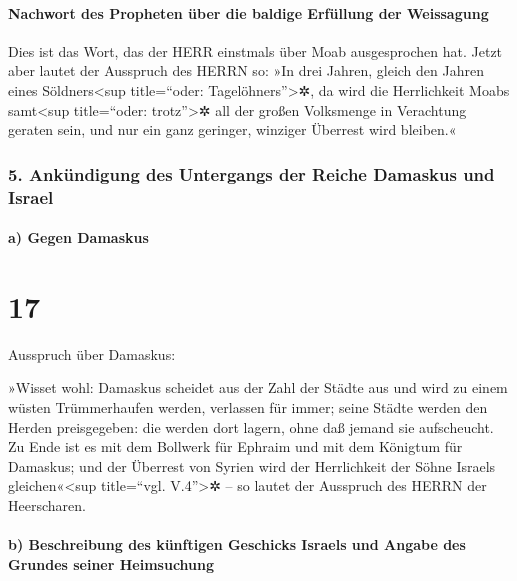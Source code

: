 \hypertarget{nachwort-des-propheten-uxfcber-die-baldige-erfuxfcllung-der-weissagung}{%
\paragraph{Nachwort des Propheten über die baldige Erfüllung der
Weissagung}\label{nachwort-des-propheten-uxfcber-die-baldige-erfuxfcllung-der-weissagung}}

Dies ist das Wort, das der HERR einstmals über Moab
ausgesprochen hat. Jetzt aber lautet der Ausspruch des
HERRN so: »In drei Jahren, gleich den Jahren eines Söldners\textless sup
title=``oder: Tagelöhners''\textgreater✲, da wird die Herrlichkeit Moabs
samt\textless sup title=``oder: trotz''\textgreater✲ all der großen
Volksmenge in Verachtung geraten sein, und nur ein ganz geringer,
winziger Überrest wird bleiben.«

\hypertarget{ankuxfcndigung-des-untergangs-der-reiche-damaskus-und-israel}{%
\subsubsection{5. Ankündigung des Untergangs der Reiche Damaskus und
Israel}\label{ankuxfcndigung-des-untergangs-der-reiche-damaskus-und-israel}}

\hypertarget{a-gegen-damaskus}{%
\paragraph{a) Gegen Damaskus}\label{a-gegen-damaskus}}

\hypertarget{section-16}{%
\section{17}\label{section-16}}

Ausspruch über Damaskus:

»Wisset wohl: Damaskus scheidet aus der Zahl der Städte aus und wird zu
einem wüsten Trümmerhaufen werden, verlassen für immer;
seine Städte werden den Herden preisgegeben: die werden dort lagern,
ohne daß jemand sie aufscheucht. Zu Ende ist es mit dem
Bollwerk für Ephraim und mit dem Königtum für Damaskus; und der Überrest
von Syrien wird der Herrlichkeit der Söhne Israels
gleichen«\textless sup title=``vgl. V.4''\textgreater✲ -- so lautet der
Ausspruch des HERRN der Heerscharen.

\hypertarget{b-beschreibung-des-kuxfcnftigen-geschicks-israels-und-angabe-des-grundes-seiner-heimsuchung}{%
\paragraph{b) Beschreibung des künftigen Geschicks Israels und Angabe
des Grundes seiner
Heimsuchung}\label{b-beschreibung-des-kuxfcnftigen-geschicks-israels-und-angabe-des-grundes-seiner-heimsuchung}}

